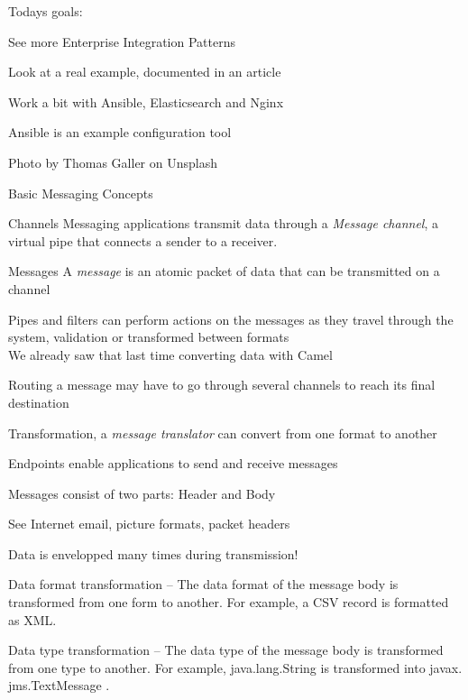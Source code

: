 \documentclass[Screen16to9,17pt]{foils}
\begin{document}


Todays goals:
\begin{list2}
\item See more Enterprise Integration Patterns
\item Look at a real example, documented in an article
\item Work a bit with Ansible, Elasticsearch and Nginx
\item Ansible is an example configuration tool
\end{list2}

Photo by Thomas Galler on Unsplash






Basic Messaging Concepts
\begin{list2}
\item Channels Messaging applications transmit data through a \emph{Message channel}, a virtual pipe that connects a sender to a receiver.
\item Messages A \emph{message} is an atomic packet of data that can be transmitted on a channel
\item Pipes and filters can perform actions on the messages as they travel through the system, validation or transformed between formats\\
We already saw that last time converting data with Camel
\item Routing a message may have to go through several channels to reach its final destination
\item Transformation, a \emph{message translator} can convert from one format to another
\item Endpoints enable applications to send and receive messages
\end{list2}



\begin{list2}
\item Messages consist of two parts: Header and Body
\item See Internet email, picture formats, packet headers
\item Data is envelopped many times during transmission!
\item Data format transformation -- The data format of the message body is transformed
from one form to another. For example, a CSV record is formatted as XML.
\item Data type transformation -- The data type of the message body is transformed from
one type to another. For example, java.lang.String is transformed into javax.
jms.TextMessage .
\end{list2}
\end{document}
